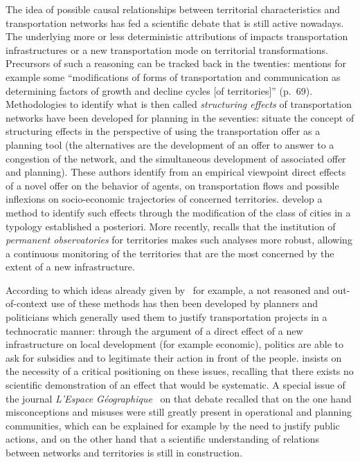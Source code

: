 The idea of possible causal relationships between territorial characteristics and transportation networks has fed a scientific debate that is still active nowadays. The underlying  more or less deterministic attributions of impacts  transportation infrastructures or  a new transportation mode on territorial transformations. Precursors of such a reasoning can be tracked back in the twenties: \cite{burgess1925city} mentions for example some ``modifications of forms of transportation and communication as determining factors of growth and decline cycles [of territories]'' (p.~69). Methodologies to identify what is then called \emph{structuring effects} of transportation networks have been developed for planning in the seventies: \cite{bonnafous1974methodologies} situate the concept of structuring effects in the perspective of using the transportation offer as a planning tool (the alternatives are the development of an offer to answer to a congestion of the network, and the simultaneous development of associated offer and planning). These authors identify from an empirical viewpoint direct effects of a novel offer on the behavior of agents, on transportation flows and possible inflexions on socio-economic trajectories of concerned territories. \cite{bonnafous1974detection} develop a method to identify such effects through the modification of the class of cities in a typology established a posteriori. More recently, \cite{bonnafous2014observatoires} recalls that the institution of \emph{permanent observatories} for territories makes such analyses more robust, allowing a continuous monitoring of the territories that are the most concerned by the extent of a new infrastructure.

According to \cite{offner1993effets} which  ideas already given by~\cite{franccois1977autoroutes} for example, a not reasoned and out-of-context use of these methods has then been developed by planners and politicians which generally used them to justify transportation projects in a technocratic manner: through the argument of a direct effect of a new infrastructure on local development (for example economic), politics are able to ask for subsidies and to legitimate their action in front of the people. \cite{offner1993effets} insists on the necessity of a critical positioning on these issues, recalling that there exists no scientific demonstration of an effect that would be systematic. A special issue of the journal \emph{L'Espace Géographique}~\citep{espacegeo2014effets} on that debate recalled that on the one hand misconceptions and misuses were still greatly present in operational and planning communities, which can be explained for example by the need to justify public actions, and on the other hand that a scientific understanding of relations between networks and territories is still in construction. 


